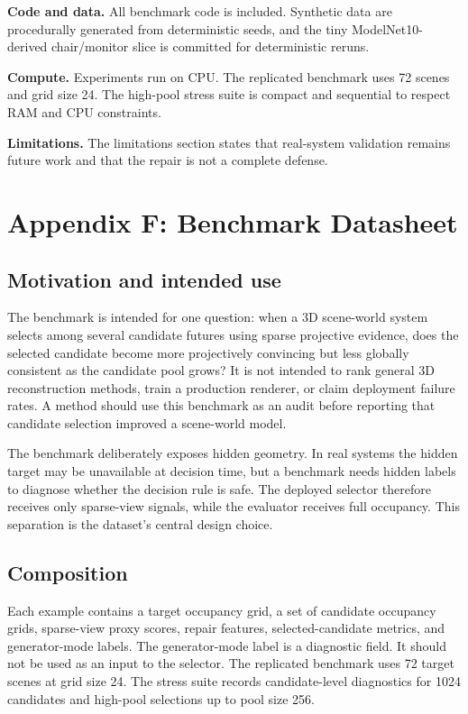 \documentclass{article}
\begin{document}
\textbf{Code and data.} All benchmark code is included. Synthetic data are
procedurally generated from deterministic seeds, and the tiny ModelNet10-derived
chair/monitor slice is committed for deterministic reruns.

\textbf{Compute.} Experiments run on CPU. The replicated benchmark uses 72
scenes and grid size 24. The high-pool stress suite is compact and sequential
to respect RAM and CPU constraints.

\textbf{Limitations.} The limitations section states that real-system
validation remains future work and that the repair is not a complete defense.

\section{Appendix F: Benchmark Datasheet}

\subsection{Motivation and intended use}

The benchmark is intended for one question: when a 3D scene-world system
selects among several candidate futures using sparse projective evidence, does
the selected candidate become more projectively convincing but less globally
consistent as the candidate pool grows? It is not intended to rank general 3D
reconstruction methods, train a production renderer, or claim deployment
failure rates. A method should use this benchmark as an audit before reporting
that candidate selection improved a scene-world model.

The benchmark deliberately exposes hidden geometry. In real systems the hidden
target may be unavailable at decision time, but a benchmark needs hidden labels
to diagnose whether the decision rule is safe. The deployed selector therefore
receives only sparse-view signals, while the evaluator receives full occupancy.
This separation is the dataset's central design choice.

\subsection{Composition}

Each example contains a target occupancy grid, a set of candidate occupancy
grids, sparse-view proxy scores, repair features, selected-candidate metrics,
and generator-mode labels. The generator-mode label is a diagnostic field. It
should not be used as an input to the selector. The replicated benchmark uses
72 target scenes at grid size 24. The stress suite records candidate-level
diagnostics for 1024 candidates and high-pool selections up to pool size 256.
\end{document}

